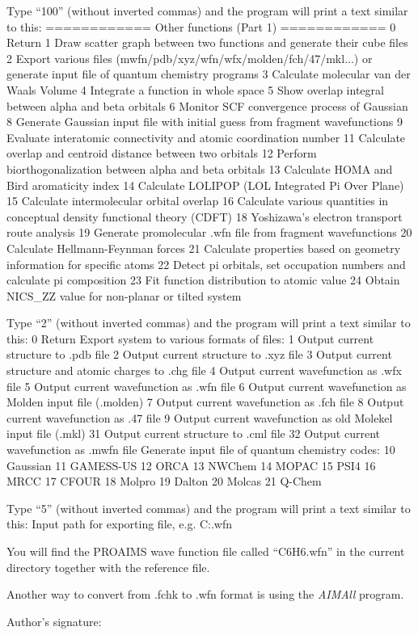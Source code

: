 \documentclass[a4paper,11pt,openany]{memoir}
\begin{document}
\begin{appendices}
\begin{consola}[	listing options={
		basicstyle=\ttfamily\tiny,
		numbers=left,
		numberstyle=\tiny\color{black}
	}]{Type ``100'' (without inverted commas) and the program will print a text similar to this:}
              ============ Other functions (Part 1) ============ 
0 Return
1 Draw scatter graph between two functions and generate their cube files
2 Export various files (mwfn/pdb/xyz/wfn/wfx/molden/fch/47/mkl...) or generate input file of quantum chemistry programs
3 Calculate molecular van der Waals Volume
4 Integrate a function in whole space
5 Show overlap integral between alpha and beta orbitals
6 Monitor SCF convergence process of Gaussian
8 Generate Gaussian input file with initial guess from fragment wavefunctions
9 Evaluate interatomic connectivity and atomic coordination number
11 Calculate overlap and centroid distance between two orbitals
12 Perform biorthogonalization between alpha and beta orbitals
13 Calculate HOMA and Bird aromaticity index
14 Calculate LOLIPOP (LOL Integrated Pi Over Plane)
15 Calculate intermolecular orbital overlap
16 Calculate various quantities in conceptual density functional theory (CDFT)
18 Yoshizawa's electron transport route analysis
19 Generate promolecular .wfn file from fragment wavefunctions
20 Calculate Hellmann-Feynman forces
21 Calculate properties based on geometry information for specific atoms
22 Detect pi orbitals, set occupation numbers and calculate pi composition
23 Fit function distribution to atomic value
24 Obtain NICS_ZZ value for non-planar or tilted system
\end{consola}
\begin{consola}{Type ``2'' (without inverted commas) and the program will print a text similar to this:}
0 Return
Export system to various formats of files:
1 Output current structure to .pdb file
2 Output current structure to .xyz file
3 Output current structure and atomic charges to .chg file
4 Output current wavefunction as .wfx file
5 Output current wavefunction as .wfn file
6 Output current wavefunction as Molden input file (.molden)
7 Output current wavefunction as .fch file
8 Output current wavefunction as .47 file
9 Output current wavefunction as old Molekel input file (.mkl)
31 Output current structure to .cml file
32 Output current wavefunction as .mwfn file
Generate input file of quantum chemistry codes:
10 Gaussian
11 GAMESS-US
12 ORCA               13 NWChem
14 MOPAC              15 PSI4
16 MRCC               17 CFOUR
18 Molpro             19 Dalton
20 Molcas             21 Q-Chem
\end{consola}
\begin{consola}{Type ``5'' (without inverted commas) and the program will print a text similar to this:}
Input path for exporting file, e.g. C:\ltwd.wfn
\end{consola}
You will find the PROAIMS wave function file called ``C6H6.wfn'' in the current directory together with the reference file.

Another way to convert from .fchk to .wfn format is using the \emph{AIMAll} program.

\end{appendices}

\newpage

Author's signature:\\[.7cm]

\end{document}
